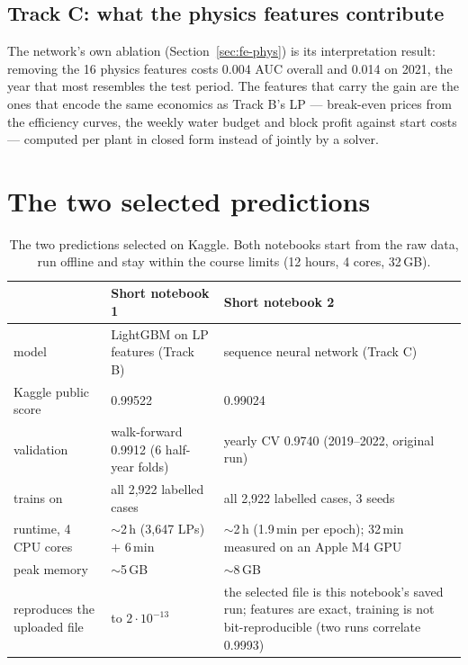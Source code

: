 \documentclass[11pt]{article}
\newcommand{\kagglelp}{0.99522}                        %
\newcommand{\kagglenn}{0.99024}                        %
\begin{document}
\subsection{Track C: what the physics features contribute}

The network's own ablation (Section~\ref{sec:fe-phys}) is its interpretation result: removing the 16
physics features costs 0.004 AUC overall and 0.014 on 2021, the year that most resembles the test
period. The features that carry the gain are the ones that encode the same economics as Track B's
LP --- break-even prices from the efficiency curves, the weekly water budget and block profit
against start costs --- computed per plant in closed form instead of jointly by a solver.

\section{The two selected predictions}
\label{sec:r-sub}

\begin{table}[H]
\centering\small
\begin{tabularx}{\linewidth}{L{3.6cm}YY}
\toprule
& Short notebook 1 & Short notebook 2 \\
\midrule
model & LightGBM on LP features (Track B) & sequence neural network (Track C) \\
Kaggle public score & \kagglelp{} & \kagglenn{} \\
validation & walk-forward 0.9912 (6 half-year folds) & yearly CV 0.9740 (2019--2022, original run) \\
trains on & all 2{,}922 labelled cases & all 2{,}922 labelled cases, 3 seeds \\
runtime, 4 CPU cores & $\sim$2\,h (3{,}647 LPs) $+$ 6\,min & $\sim$2\,h (1.9\,min per epoch); 32\,min measured on an Apple M4 GPU \\
peak memory & $\sim$5\,GB & $\sim$8\,GB \\
reproduces the uploaded file & to $2\cdot 10^{-13}$ & the selected file is this notebook's saved run; features are exact, training is not bit-reproducible (two runs correlate 0.9993) \\
\bottomrule
\end{tabularx}
\caption{The two predictions selected on Kaggle. Both notebooks start from the raw data, run
offline and stay within the course limits (12 hours, 4 cores, 32\,GB).}
\end{table}
\end{document}
